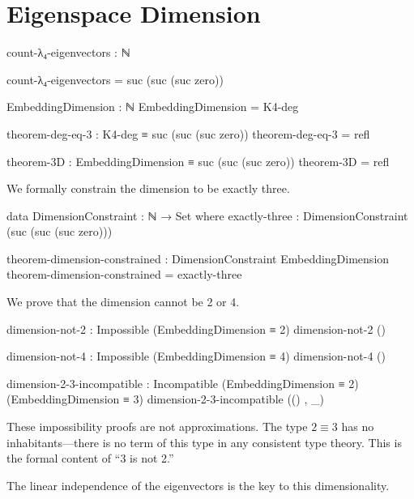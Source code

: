 \documentclass[11pt,a4paper]{book}
\begin{document}
\section{Eigenspace Dimension}

\begin{code}
count-λ₄-eigenvectors : ℕ

count-λ₄-eigenvectors = suc (suc (suc zero))

EmbeddingDimension : ℕ
EmbeddingDimension = K4-deg

\end{code}

\begin{code}
theorem-deg-eq-3 : K4-deg ≡ suc (suc (suc zero))
theorem-deg-eq-3 = refl

theorem-3D : EmbeddingDimension ≡ suc (suc (suc zero))
theorem-3D = refl

\end{code}

We formally constrain the dimension to be exactly three.

\begin{code}
data DimensionConstraint : ℕ → Set where
  exactly-three : DimensionConstraint (suc (suc (suc zero)))

theorem-dimension-constrained : DimensionConstraint EmbeddingDimension
theorem-dimension-constrained = exactly-three

\end{code}

We prove that the dimension cannot be 2 or 4.

\begin{code}
dimension-not-2 : Impossible (EmbeddingDimension ≡ 2)
dimension-not-2 ()

dimension-not-4 : Impossible (EmbeddingDimension ≡ 4)
dimension-not-4 ()

\end{code}

\begin{code}
dimension-2-3-incompatible : Incompatible (EmbeddingDimension ≡ 2) (EmbeddingDimension ≡ 3)
dimension-2-3-incompatible (() , _)

\end{code}

These impossibility proofs are not approximations. The type $2 \equiv 3$ has no inhabitants---there is no term of this type in any consistent type theory. This is the formal content of ``3 is not 2.''

The linear independence of the eigenvectors is the key to this dimensionality.
\end{document}
